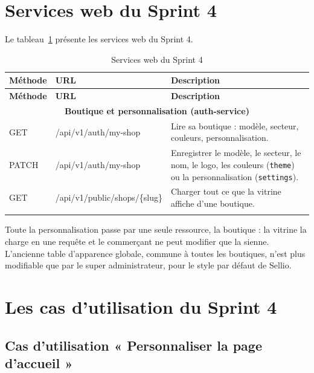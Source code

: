 \section{Services web du Sprint 4}
Le tableau~\ref{tab:ws-sprint4} présente les services web du Sprint 4.
\renewcommand{\arraystretch}{1.15}
\setlength{\tabcolsep}{4pt}
\begin{longtable}{|p{1.5cm}|p{6.8cm}|p{6.2cm}|}
\hline
\textbf{Méthode} & \textbf{URL} & \textbf{Description} \\
\hline
\endfirsthead
\hline
\textbf{Méthode} & \textbf{URL} & \textbf{Description} \\
\hline
\endhead
\multicolumn{3}{|c|}{\textbf{Boutique et personnalisation (auth-service)}} \\
\hline
GET & /api/v1/auth/my-shop & Lire sa boutique : modèle, secteur, couleurs, personnalisation. \\
\hline
PATCH & /api/v1/auth/my-shop & Enregistrer le modèle, le secteur, le nom, le logo, les couleurs (\texttt{theme}) ou la personnalisation (\texttt{settings}). \\
\hline
GET & /api/v1/public/shops/\{slug\} & Charger tout ce que la vitrine affiche d'une boutique. \\
\hline
\caption{Services web du Sprint 4}
\label{tab:ws-sprint4}
\end{longtable}

Toute la personnalisation passe par une seule ressource, la boutique : la vitrine la charge en une requête et le commerçant ne peut modifier que la sienne. L'ancienne table d'apparence globale, commune à toutes les boutiques, n'est plus modifiable que par le super administrateur, pour le style par défaut de Sellio.

\section{Les cas d'utilisation du Sprint 4}
\subsection{Cas d'utilisation « Personnaliser la page d'accueil »}
